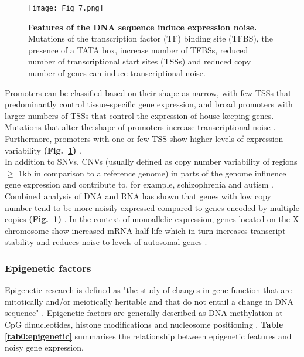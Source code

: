 \newpage

\begin{figure}[!h]
\centering
\texttt{[image: Fig\_7.png]}
\caption[Features of the DNA sequence induce expression noise]{\textbf{Features of the DNA sequence induce expression noise.}\\
Mutations of the transcription factor (TF) binding site (TFBS), the presence of a TATA box, increase number of TFBSs, reduced number of transcriptional start sites (TSSs) and reduced copy number of genes can induce transcriptional noise.}
\label{fig0:DNA_features}
\end{figure}

Promoters can be classified based on their shape as narrow, with few \glspl{TSS} that predominantly control tissue-specific gene expression, and broad promoters with larger numbers of TSSs that control the expression of house keeping genes. Mutations that alter the shape of promoters increase transcriptional noise \citep{Schor2017a}. Furthermore, promoters with one or few TSS show higher levels of expression variability \textbf{(Fig.~\ref{fig0:DNA_features})} \citep{Faure2017}.\\

In addition to \glspl{SNV}, \glspl{CNV} (usually defined as copy number variability of regions $\geq$ 1kb in comparison to a reference genome) in parts of the genome influence gene expression and contribute to, for example, schizophrenia and autism \citep{Gamazon2015}. Combined analysis of DNA and RNA has shown that genes with low copy number tend to be more noisily expressed compared to genes encoded by multiple copies \textbf{(Fig.~\ref{fig0:DNA_features})} \citep{Dey2015}. In the context of monoallelic expression, genes located on the X chromosome show increased mRNA half-life which in turn increases transcript stability and reduces noise to levels of autosomal genes \citep{Faure2017}.

\subsubsection{Epigenetic factors}
\label{sec0:epigenetic}

Epigenetic research is defined as "the study of changes in gene function that are mitotically and/or meiotically heritable and that do not entail a change in DNA sequence" \citep{Wu2001}. Epigenetic factors are generally described as DNA methylation at \gls{CpG} dinucleotides, histone modifications and nucleosome positioning  \citep{Portela2010}. \textbf{Table \ref{tab0:epigenetic}} summarises the relationship between epigenetic features and noisy gene expression. \\


